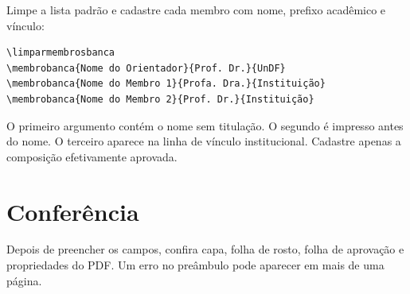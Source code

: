 Limpe a lista padrão e cadastre cada membro com nome, prefixo acadêmico e vínculo:

\begin{lstlisting}
\limparmembrosbanca
\membrobanca{Nome do Orientador}{Prof. Dr.}{UnDF}
\membrobanca{Nome do Membro 1}{Profa. Dra.}{Instituição}
\membrobanca{Nome do Membro 2}{Prof. Dr.}{Instituição}
\end{lstlisting}

O primeiro argumento contém o nome sem titulação. O segundo é impresso antes do nome. O terceiro aparece na linha de vínculo institucional. Cadastre apenas a composição efetivamente aprovada.

\section{Conferência}

Depois de preencher os campos, confira capa, folha de rosto, folha de aprovação e propriedades do PDF. Um erro no preâmbulo pode aparecer em mais de uma página.
